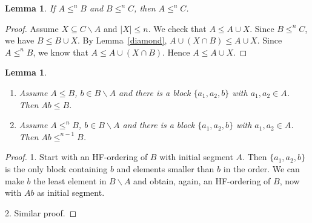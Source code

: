 \documentclass[10pt,a4paper]{article}
\theoremstyle{note}
\newtheorem{lemma}[thm]{Lemma}
\begin{document}
\begin{lemma}\label{sat3}  If  $A\leq^n B$ and $B\leq^n C$, then $A\leq^n C$.
\end{lemma}
\begin{proof}  Assume $X\subseteq C \smallsetminus A$  and $|X|\leq n$. We check that  $A\leq A\cup X$. Since $B\leq^n C$, we have $B\leq B\cup X$. By Lemma~\ref{diamond},   $A\cup (X\cap B)\leq A\cup X$.
	Since $A\leq^n B$, we know that $A\leq A\cup (X\cap B)$.  Hence  $A\leq A\cup X$.
\end{proof}
	

	
\begin{lemma}\label{Feb_23_2024_1}\begin{enumerate}
			\item Assume $A\leq B$, $ b\in B\smallsetminus A$ and there is a block $\{a_1,a_2,b\}$  with  $a_1,a_2\in A$. Then  $Ab\leq B$.
			\item Assume $A\leq^n B$, $b\in B\smallsetminus A$ and there is a block $\{a_1,a_2,b\}$  with  $a_1,a_2\in A$. Then  $Ab\leq^{n-1} B$.
		\end{enumerate}
	\end{lemma}
	\begin{proof} 1.  Start with an HF-ordering of $B$ with initial segment $A$. Then $\{a_1,a_2,b\}$ is the only block containing $b$ and elements  smaller than $b$ in the order.  We can make $b$ the least element in $B\smallsetminus A$ and obtain, again, an HF-ordering of $B$, now with $Ab$ as initial segment. 
		
		2. Similar proof.
	\end{proof}
\end{document}
